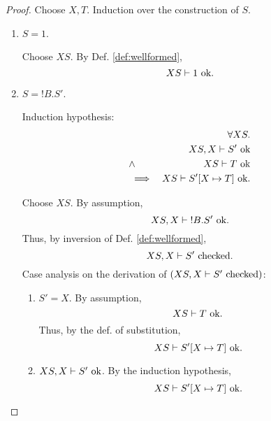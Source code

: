 \documentclass{llncs}
\newcommand*{\send}{\mathord{!}}
\newcommand*{\envimpl}       [2]{#1 \vdash #2}
\newcommand*{\envimplchecked}[2]{\envimpl{#1}{\text{$#2$ {\normalfont \rmfamily checked}}}}
\newcommand*{\envimplok}     [2]{\envimpl{#1}{\text{$#2$ {\normalfont \rmfamily ok}}}}
\renewcommand*{\|}{\;|\;}
\begin{document}
\begin{proof}
  Choose $X, T$. Induction over the construction of $S$.
  \begin{enumerate}
    \item
      \label{case:substitution_wellformedness:1}
      $S = 1$.

      Choose $XS$. By Def. \ref{def:wellformed},
      \begin{equation*}
        \envimplok{XS}{1}.
      \end{equation*}

    \item
      \label{case:substitution_wellformedness:send}
      $S = \send B.S'$.

      Induction hypothesis:
      \begin{eqnarray*}
        &&         \forall XS. \\
        &&         \envimplok{XS, X}{S'} \\
        &\land&    \envimplok{XS}{T} \\
        &\implies& \envimplok{XS}{S'[X \mapsto T]}.
      \end{eqnarray*}

      Choose $XS$. By assumption,
      \begin{equation*}
        \envimplok{XS, X}{\send B.S'}.
      \end{equation*}
      Thus, by inversion of Def. \ref{def:wellformed},
      \begin{equation*}
        \envimplchecked{XS, X}{S'}.
      \end{equation*}
      Case analysis on the derivation of $(\envimplchecked{XS, X}{S'})$:
      \begin{enumerate}
        \item $S' = X$.
          By assumption,
          \begin{equation*}
            \envimplok{XS}{T}.
          \end{equation*}
          Thus, by the def. of substitution,
          \begin{equation*}
            \envimplok{XS}{S'[X \mapsto T]}.
          \end{equation*}

        \item $\envimplok{XS, X}{S'}$.
          By the induction hypothesis,
          \begin{equation*}
            \envimplok{XS}{S'[X \mapsto T]}.
          \end{equation*}
      \end{enumerate}


\end{enumerate}
\end{proof}
\end{document}
